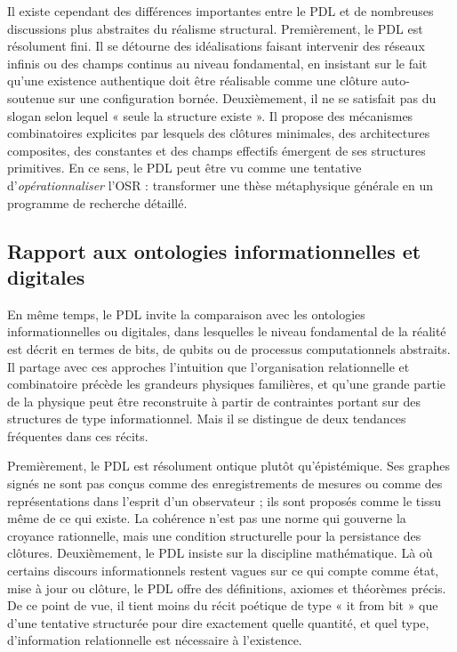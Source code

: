 \documentclass[11pt,a4paper]{article}
\theoremstyle{definition}
\begin{document}
Il existe cependant des différences importantes entre le PDL et de nombreuses discussions plus abstraites du réalisme structural. Premièrement, le PDL est résolument fini. Il se détourne des idéalisations faisant intervenir des réseaux infinis ou des champs continus au niveau fondamental, en insistant sur le fait qu’une existence authentique doit être réalisable comme une clôture auto-soutenue sur une configuration bornée.\cite{Laubscher_EmergencePhysicalReality_2024,Laubscher_MinimalClosures_46_2024} Deuxièmement, il ne se satisfait pas du slogan selon lequel « seule la structure existe ». Il propose des mécanismes combinatoires explicites par lesquels des clôtures minimales, des architectures composites, des constantes et des champs effectifs émergent de ses structures primitives.\cite{Laubscher_PDL_GlobalMapping_v6_2024} En ce sens, le PDL peut être vu comme une tentative d’\emph{opérationnaliser} l’OSR : transformer une thèse métaphysique générale en un programme de recherche détaillé.

\subsection{Rapport aux ontologies informationnelles et digitales}

En même temps, le PDL invite la comparaison avec les ontologies informationnelles ou digitales, dans lesquelles le niveau fondamental de la réalité est décrit en termes de bits, de qubits ou de processus computationnels abstraits. Il partage avec ces approches l’intuition que l’organisation relationnelle et combinatoire précède les grandeurs physiques familières, et qu’une grande partie de la physique peut être reconstruite à partir de contraintes portant sur des structures de type informationnel.\cite{Laubscher_EmergencePhysicalReality_2024,Laubscher_EffectiveFields_2024} Mais il se distingue de deux tendances fréquentes dans ces récits.

Premièrement, le PDL est résolument ontique plutôt qu’épistémique. Ses graphes signés ne sont pas conçus comme des enregistrements de mesures ou comme des représentations dans l’esprit d’un observateur ; ils sont proposés comme le tissu même de ce qui existe.\cite{Laubscher_PDL_Position_2024,Laubscher_Leakage_Probability_2024} La cohérence n’est pas une norme qui gouverne la croyance rationnelle, mais une condition structurelle pour la persistance des clôtures. Deuxièmement, le PDL insiste sur la discipline mathématique. Là où certains discours informationnels restent vagues sur ce qui compte comme état, mise à jour ou clôture, le PDL offre des définitions, axiomes et théorèmes précis.\cite{Laubscher_IntroPDL_2024,Laubscher_MinimalClosures_46_2024} De ce point de vue, il tient moins du récit poétique de type « it from bit » que d’une tentative structurée pour dire exactement quelle quantité, et quel type, d’information relationnelle est nécessaire à l’existence.
\end{document}
